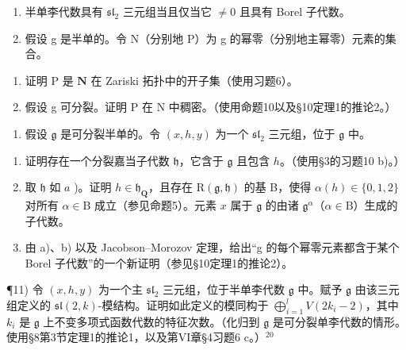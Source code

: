 \begin{enumerate}
\def\labelenumi{\arabic{enumi})}
\setcounter{enumi}{7}
\item
  半单李代数具有 \(\mathfrak{sl}_2\) 三元组当且仅当它 \(\neq 0\) 且具有 Borel 子代数。
\item
  假设 g 是半单的。令 N（分别地 P）为 g 的幂零（分别地主幂零）元素的集合。
\end{enumerate}

\begin{enumerate}
\def\labelenumi{\alph{enumi})}
\item
  证明 \(\mathrm{P}\) 是 \(\mathbf{N}\) 在 Zariski 拓扑中的开子集（使用习题6）。
\item
  假设 g 可分裂。证明 P 在 N 中稠密。（使用命题10以及§10定理1的推论2。）
\end{enumerate}

\begin{enumerate}
\def\labelenumi{\arabic{enumi})}
\setcounter{enumi}{9}
\tightlist
\item
  假设 \(\mathfrak{g}\) 是可分裂半单的。令 \((x,h,y)\) 为一个 \(\mathfrak{sl}_2\) 三元组，位于 \(\mathfrak{g}\) 中。
\end{enumerate}

\begin{enumerate}
\def\labelenumi{\alph{enumi})}
\item
  证明存在一个分裂嘉当子代数 \(\mathfrak{h}\)，它含于 \(\mathfrak{g}\) 且包含 \(h\)。（使用§3的习题10 b)。）
\item
  取 \(\mathfrak{h}\) 如 \(a\) )。证明 \(h \in \mathfrak{h}_{\mathbf{Q}}\)，且存在 \(\mathrm{R}(\mathfrak{g}, \mathfrak{h})\) 的基 B，使得 \(\alpha(h) \in \{0, 1, 2\}\) 对所有 \(\alpha \in \mathrm{B}\) 成立（参见命题5）。元素 \(x\) 属于 \(\mathfrak{g}\) 的由诸 \(\mathfrak{g}^{\alpha}\)（\(\alpha \in \mathrm{B}\)）生成的子代数。
\item
  由 a)、b) 以及 Jacobson–Morozov 定理，给出“g 的每个幂零元素都含于某个 Borel 子代数”的一个新证明（参见§10定理1的推论2）。
\end{enumerate}

¶11) 令 \((x,h,y)\) 为一个主 \(\mathfrak{sl}_2\) 三元组，位于半单李代数 \(\mathfrak{g}\) 中。赋予 \(\mathfrak{g}\) 由该三元组定义的 \(\mathfrak{sl}(2,k)\)-模结构。证明如此定义的模同构于 \(\bigoplus_{i=1}^{l} V(2k_i - 2)\)，其中 \(k_i\) 是 \(\mathfrak{g}\) 上不变多项式函数代数的特征次数。（化归到 \(\mathfrak{g}\) 是可分裂单李代数的情形。使用§8第3节定理1的推论1，以及第VI章§4习题6 c。）\(^{20}\)

